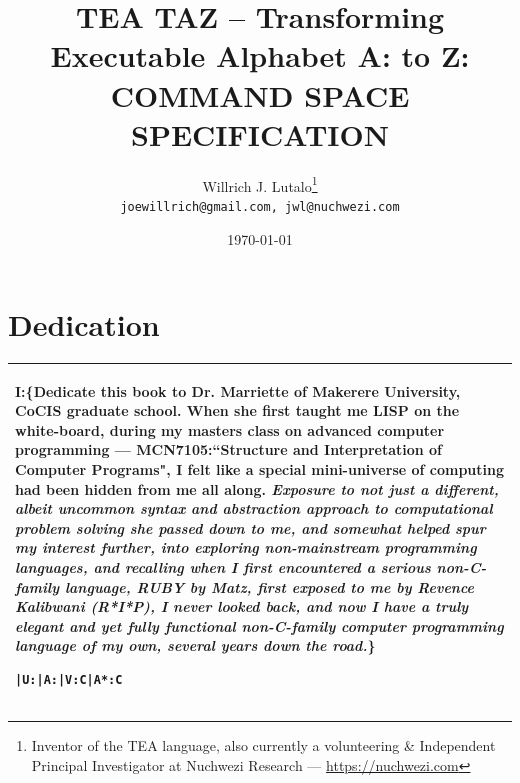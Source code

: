 \documentclass[a4paper, 18pt]{book} %
\title{\textbf{TEA TAZ} – \textbf{T}ransforming \textbf{E}xecutable \textbf{A}lphabet A: to Z: COMMAND SPACE SPECIFICATION}
\author{Willrich J. Lutalo\thanks{Inventor of the TEA language, also currently a volunteering \& Independent Principal Investigator at Nuchwezi Research --- \url{https://nuchwezi.com}}\\
\texttt{joewillrich@gmail.com, jwl@nuchwezi.com}}
\date{\today}
\begin{document}
\frontmatter








\maketitle

\chapter*{Dedication}


\begin{table}[H]
  \centering
  \LARGE
	\begin{tabular}[t]{|p{}}
I:\{\textbf{Dedicate this book to Dr. Marriette of Makerere University, CoCIS graduate school.} When she first taught me LISP on the white-board, during my masters class on advanced computer programming --- \textbf{MCN7105}:``Structure and Interpretation of Computer Programs", I felt like a special mini-universe of computing had been hidden from me all along. \textit{Exposure to not just a different, albeit uncommon syntax and abstraction approach to computational problem solving she passed down to me, and somewhat helped spur my interest further, into exploring non-mainstream programming languages, and recalling when I first encountered a serious non-C-family language, RUBY by Matz, first exposed to me by Revence Kalibwani (R*I*P), I never looked back, and now I have a truly elegant and yet fully functional non-C-family computer programming language of my own, several years down the road.}\}
\begin{verbatim}
|U:|A:|V:C|A*:C 
\end{verbatim}
\\
	\hline
	              
\end{tabular}
  \label{TABDEDC}
\end{table}

\tableofcontents

\listoffigures

\listoftables

\newpage

\Large
\end{document}

